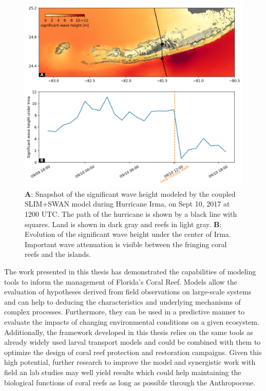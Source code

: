 \begin{figure}
    \centering
    \includegraphics[width=\textwidth]{chapters/conclusions/figures/swh_curve.png}
    \caption{\textbf{A}: Snapshot of the significant wave height modeled by the coupled SLIM+SWAN model during Hurricane Irma, on Sept 10, 2017 at 1200 UTC. The path of the hurricane is shown by a black line with squares. Land is shown in dark gray and reefs in light gray. \textbf{B}: Evolution of the significant wave height under the center of Irma. Important wave attenuation is visible between the fringing coral reefs and the islands.}
    \label{ccl:swh}
\end{figure}

The work presented in this thesis has demonstrated the capabilities of modeling tools to inform the management of Florida's Coral Reef. Models allow the evaluation of hypotheses derived from field observations on large-scale systems and can help to deducing the characteristics and underlying mechanisms of complex processes. Furthermore, they can be used in a predictive manner to evaluate the impacts of changing environmental conditions on a given ecosystem. Additionally, the framework developed in this thesis relies on the same tools as already widely used larval transport models and could be combined with them to optimize the design of coral reef protection and restoration campaigns. Given this high potential, further research to improve the model and synergistic work with field an lab studies may well yield results which could help maintaining the biological functions of coral reefs as long as possible through the Anthropocene.